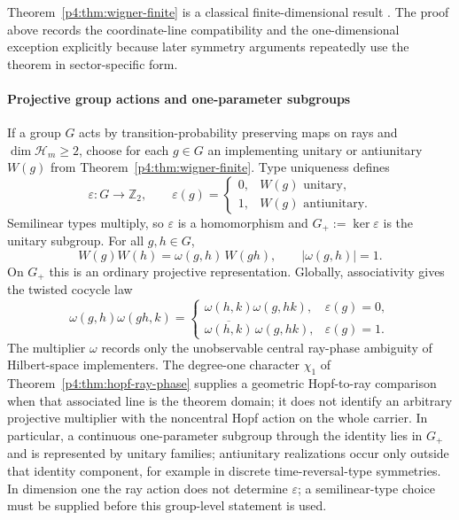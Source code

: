 \documentclass[12pt,a4paper]{article}
\begin{document}
\begin{remark}
\label{p4:rem:wigner-status}
Theorem~\ref{p4:thm:wigner-finite} is a classical finite-dimensional result \cite{Wigner1959,Uhlhorn1963}.
The proof above records the coordinate-line compatibility and the
one-dimensional exception explicitly because later symmetry arguments
repeatedly use the theorem in sector-specific form.
\end{remark}



\paragraph{Projective group actions and one-parameter subgroups}
\label{p4:sec:part2-projective-groups}

If a group \(G\) acts by transition-probability preserving maps on rays and
\(\dim\mathcal H_m\ge2\), choose for each \(g\in G\) an implementing unitary
or antiunitary \(W(g)\) from Theorem~\ref{p4:thm:wigner-finite}.  Type
uniqueness defines
\[
\varepsilon:G\longrightarrow\mathbb Z_2,
\qquad
\varepsilon(g)=
\begin{cases}
0,&W(g)\text{ unitary},\\
1,&W(g)\text{ antiunitary}.
\end{cases}
\]
Semilinear types multiply, so \(\varepsilon\) is a homomorphism and
\(G_+:=\ker\varepsilon\) is the unitary subgroup.  For all \(g,h\in G\),
\begin{equation}
\label{p4:eq:projective-rep}
W(g)W(h)=\omega(g,h)\,W(gh),
\qquad
|\omega(g,h)|=1.
\end{equation}
On \(G_+\) this is an ordinary projective representation.  Globally,
associativity gives the twisted cocycle law
\[
\omega(g,h)\omega(gh,k)
=
\begin{cases}
\omega(h,k)\omega(g,hk),&\varepsilon(g)=0,\\
\overline{\omega(h,k)}\,\omega(g,hk),&\varepsilon(g)=1.
\end{cases}
\]
The multiplier \(\omega\) records only the unobservable central ray-phase
ambiguity of Hilbert-space implementers.  The degree-one character
\(\chi_1\) of Theorem~\ref{p4:thm:hopf-ray-phase} supplies a geometric
Hopf-to-ray comparison when that associated line is the theorem domain; it
does not identify an arbitrary projective multiplier with the noncentral
Hopf action on the whole carrier.
In particular, a continuous one-parameter subgroup through the identity lies
in \(G_+\) and is represented by unitary families; antiunitary realizations
occur only outside that identity component, for example in discrete
time-reversal-type symmetries.  In dimension one the ray action does not
determine \(\varepsilon\); a semilinear-type choice must be supplied before
this group-level statement is used.
\end{document}
